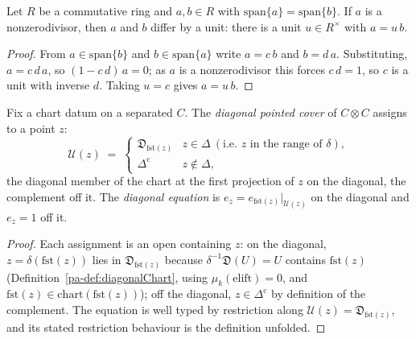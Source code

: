 \begin{lemma}
  \label{pa-lem:exists_isUnit_of_span_singleton_eq}
  \leanok

  Let \(R\) be a commutative ring and \(a, b \in R\) with \(\mathrm{span}\{a\} = \mathrm{span}\{b\}\).
  If \(a\) is a nonzerodivisor, then \(a\) and \(b\) differ by a unit: there is a unit \(u \in
  R^{\times}\) with \(a = u\,b\).
\end{lemma}
\begin{proof}
  \leanok
  From \(a \in \mathrm{span}\{b\}\) and \(b \in \mathrm{span}\{a\}\) write \(a = c\,b\) and \(b =
  d\,a\). Substituting, \(a = c\,d\,a\), so \((1 - c\,d)\,a = 0\); as \(a\) is a nonzerodivisor this
  forces \(c\,d = 1\), so \(c\) is a unit with inverse \(d\). Taking \(u = c\) gives \(a = u\,b\).
\end{proof}

\begin{definition}
  \label{pa-def:diagonalCover}
  \leanok

  Fix a chart datum on a separated \(C\). The \emph{diagonal pointed cover} of \(C \otimes C\)
  assigns to a point \(z\):
  \[
    \mathcal U(z) \;=\;
      \begin{cases}
        \mathfrak D_{\mathrm{fst}(z)} & z \in \Delta \ (\text{i.e. } z \text{ in the range of } \delta),\\
        \Delta^{\mathrm c} & z \notin \Delta,
      \end{cases}
  \]
  the diagonal member of the chart at the first projection of \(z\) on the diagonal, the complement
  off it. The \emph{diagonal equation} is \(e_z = e_{\mathrm{fst}(z)}|_{\mathcal U(z)}\) on the
  diagonal and \(e_z = 1\) off it.
\end{definition}
\begin{proof}
  \leanok
  Each assignment is an open containing \(z\): on the diagonal, \(z = \delta(\mathrm{fst}(z))\)
  lies in \(\mathfrak D_{\mathrm{fst}(z)}\) because \(\delta^{-1}\mathfrak D(U) = U\) contains
  \(\mathrm{fst}(z)\) (Definition~\ref{pa-def:diagonalChart}, using \(\mu_k(\mathrm{elift}) = 0\), and
  \(\mathrm{fst}(z) \in \mathrm{chart}(\mathrm{fst}(z))\)); off the diagonal, \(z \in
  \Delta^{\mathrm c}\) by definition of the complement. The equation is well typed by restriction
  along \(\mathcal U(z) = \mathfrak D_{\mathrm{fst}(z)}\), and its stated restriction behaviour is
  the definition unfolded.
\end{proof}

